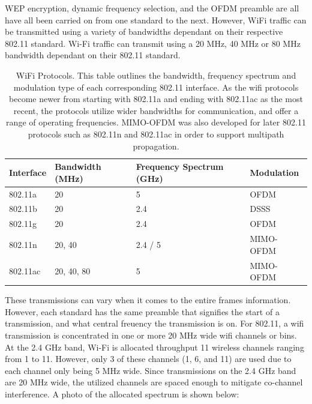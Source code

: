 WEP encryption, dynamic frequency selection, and the OFDM preamble are all have all been carried on from one standard to the next.  However, WiFi traffic can be transmitted using a variety of bandwidths dependant on their respective 802.11 standard.  Wi-Fi traffic can transmit using a 20 MHz, 40 MHz or 80 MHz bandwidth dependant on their 802.11 standard. 
\begin{table}[ht]
\centering
\caption{WiFi Protocols.  This table outlines the bandwidth, frequency spectrum and modulation type of each corresponding 802.11 interface. As the wifi protocols become newer from starting with 802.11a and ending with 802.11ac as the most recent, the protocols utilize wider bandwidths for communication, and offer a range of operating frequencies. MIMO-OFDM was also developed for later 802.11 protocols such as 802.11n and 802.11ac in order to support multipath propagation.}
\label{table:wifi_protocols}
\begin{tabular}{|l|l|l|l|}
  \hline
  Interface & Bandwidth (MHz) & Frequency Spectrum (GHz) & Modulation \\ \hline
          802.11a &              20 &                  5 &       OFDM \\
          802.11b &              20 &                2.4 &       DSSS \\
          802.11g &              20 &                2.4 &       OFDM \\
          802.11n &          20, 40 &            2.4 / 5 &  MIMO-OFDM \\
         802.11ac &      20, 40, 80 &                  5 &  MIMO-OFDM \\ \hline
\end{tabular}
\end{table}\par
These transmissions can vary when it comes to the entire frames information. However, each standard has the same preamble that signifies the start of a transmission, and what central freuency the transmission is on.  For 802.11, a wifi transmission is concentrated in one or more 20 MHz wide wifi channels or bins. At the 2.4 GHz band, Wi-Fi is allocated throughput 11 wireless channels ranging from 1 to 11.  However, only 3 of these channels (1, 6, and 11) are used due to each channel only being 5 MHz wide.  Since transmissions on the 2.4 GHz band are 20 MHz wide, the utilized channels are spaced enough to mitigate co-channel interference. A photo of the allocated spectrum is shown below:


